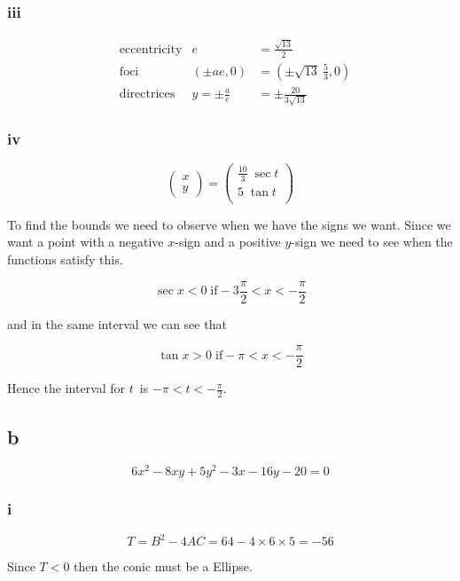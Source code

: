 \documentclass{article}
\begin{document}
\subsubsection{iii}

\begin{align*}
	 & \mathrm{eccentricity} & e               & = \frac {\sqrt {13}}2            \\
	 & \mathrm{foci}         & (\pm ae, 0)     & = (\pm\sqrt {13}~ \frac {5} 3,0) \\
	 & \mathrm{directrices}  & y = \pm\frac ae & = \pm \frac {20} {3\sqrt {13}}
\end{align*}

\subsubsection{iv}

$$
	\begin{pmatrix}
		x \\ y
	\end{pmatrix}
	=
	\begin{pmatrix}
		\frac {10}3\; \sec t \\
		5       \;\tan t     \\
	\end{pmatrix}
$$

To find the bounds we need to observe when we have the signs we want. Since we want a point with a negative $x$-sign and a positive $y$-sign we need to see when the functions satisfy this.

$$\sec x < 0 \;\mathrm{if} -3\frac \pi 2 < x < - \frac \pi 2$$

and in the same interval we can see that

$$\tan x > 0 \;\mathrm{if} -\pi < x < - \frac \pi 2$$

Hence the interval for $t$ is $-\pi < t < - \frac \pi 2$.

\subsection{b}

$$6x^2 - 8xy + 5y^2 - 3x - 16y - 20 = 0$$

\subsubsection{i}

$$T = B^2 - 4 AC = 64 - 4 \times 6 \times 5 = -56$$

Since $T < 0$ then the conic must be a Ellipse.
\end{document}
